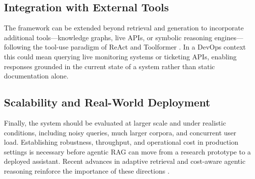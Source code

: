 \documentclass[conference]{IEEEtran}
\begin{document}
\subsection{Integration with External Tools}
The framework can be extended beyond retrieval and generation to incorporate additional tools---knowledge graphs, live APIs, or symbolic reasoning engines---following the tool-use paradigm of ReAct \cite{yao2022react} and Toolformer \cite{schick2023toolformer}. In a DevOps context this could mean querying live monitoring systems or ticketing APIs, enabling responses grounded in the current state of a system rather than static documentation alone.

\subsection{Scalability and Real-World Deployment}
Finally, the system should be evaluated at larger scale and under realistic conditions, including noisy queries, much larger corpora, and concurrent user load. Establishing robustness, throughput, and operational cost in production settings is necessary before agentic RAG can move from a research prototype to a deployed assistant. Recent advances in adaptive retrieval and cost-aware agentic reasoning reinforce the importance of these directions \cite{maharjan2026chunking, mishra2026sok}.



\end{document}
